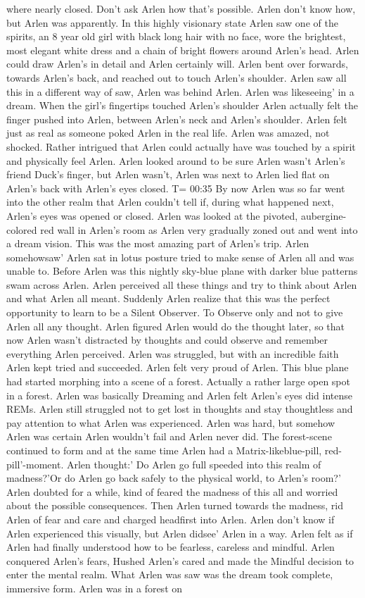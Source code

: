 \documentclass[12pt]{book}
\begin{document}
where nearly closed. Don't ask Arlen how that's possible. Arlen don't know how, but Arlen was apparently. In this highly visionary state Arlen saw one of the spirits, an 8 year old girl with black long hair with no face, wore the brightest, most elegant white dress and a chain of bright flowers around Arlen's head. Arlen could draw Arlen's in detail and Arlen certainly will. Arlen bent over forwards, towards Arlen's back, and reached out to touch Arlen's shoulder. Arlen saw all this in a different way of saw, Arlen was behind Arlen. Arlen was likeseeing' in a dream. When the girl's fingertips touched Arlen's shoulder Arlen actually felt the finger pushed into Arlen, between Arlen's neck and Arlen's shoulder. Arlen felt just as real as someone poked Arlen in the real life. Arlen was amazed, not shocked. Rather intrigued that Arlen could actually have was touched by a spirit and physically feel Arlen. Arlen looked around to be sure Arlen wasn't Arlen's friend Duck's finger, but Arlen wasn't, Arlen was next to Arlen lied flat on Arlen's back with Arlen's eyes closed. T= 00:35 By now Arlen was so far went into the other realm that Arlen couldn't tell if, during what happened next, Arlen's eyes was opened or closed. Arlen was looked at the pivoted, aubergine-colored red wall in Arlen's room as Arlen very gradually zoned out and went into a dream vision. This was the most amazing part of Arlen's trip. Arlen somehowsaw' Arlen sat in lotus posture tried to make sense of Arlen all and was unable to. Before Arlen was this nightly sky-blue plane with darker blue patterns swam across Arlen. Arlen perceived all these things and try to think about Arlen and what Arlen all meant. Suddenly Arlen realize that this was the perfect opportunity to learn to be a Silent Observer. To Observe only and not to give Arlen all any thought. Arlen figured Arlen would do the thought later, so that now Arlen wasn't distracted by thoughts and could observe and remember everything Arlen perceived. Arlen was struggled, but with an incredible faith Arlen kept tried and succeeded. Arlen felt very proud of Arlen. This blue plane had started morphing into a scene of a forest. Actually a rather large open spot in a forest. Arlen was basically Dreaming and Arlen felt Arlen's eyes did intense REMs. Arlen still struggled not to get lost in thoughts and stay thoughtless and pay attention to what Arlen was experienced. Arlen was hard, but somehow Arlen was certain Arlen wouldn't fail and Arlen never did. The forest-scene continued to form and at the same time Arlen had a Matrix-likeblue-pill, red-pill'-moment. Arlen thought:' Do Arlen go full speeded into this realm of madness?'Or do Arlen go back safely to the physical world, to Arlen's room?' Arlen doubted for a while, kind of feared the madness of this all and worried about the possible consequences. Then Arlen turned towards the madness, rid Arlen of fear and care and charged headfirst into Arlen. Arlen don't know if Arlen experienced this visually, but Arlen didsee' Arlen in a way. Arlen felt as if Arlen had finally understood how to be fearless, careless and mindful. Arlen conquered Arlen's fears, Hushed Arlen's cared and made the Mindful decision to enter the mental realm. What Arlen was saw was the dream took complete, immersive form. Arlen was in a forest on 
\end{document}
